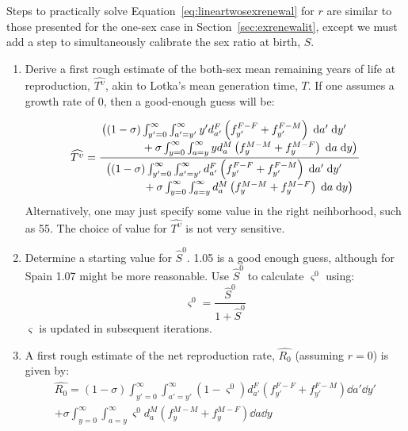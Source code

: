  \FloatBarrier
\label{sec:exrenewalit2}
Steps to practically solve Equation~\eqref{eq:lineartwosexrenewal} for $r$ are
similar to those presented for the one-sex case in
Section~\ref{sec:exrenewalit}, except we must add a step to simultaneously
calibrate the sex ratio at birth, $S$.
\begin{enumerate}
  \item Derive a first rough estimate of the both-sex mean remaining years of
  life at reproduction, $\widehat{T^\upsilon}$, akin to Lotka's mean generation time,
  $T$. If one assumes a growth rate of $0$, then a good-enough guess will be:

\begin{equation}
\label{eq:Tguess}
\widehat{T^\upsilon} = \frac{\splitfrac{
   \big((1 - \sigma)  \int _{y'=0}^\infty \int_{a'=y'}^\infty 
       y' d_{a'}^F \left( f_{y'}^{F-F} + f_{y'}^{F-M} \right) \dd a'\dd y'}{ + 
   \sigma \int_{y=0}^\infty \int _{a=y}^\infty y d_{a}^M  \left( f_{y}^{M-M}+
   f_{y}^{M-F} \right) \dd a \dd y \big)}}{\splitfrac{\big( (1 - \sigma) 
   \int_{y'=0}^\infty \int_{a'=y'}^\infty d_{a'}^F \left( f_{y'}^{F-F} +
   f_{y'}^{F-M} \right) \dd a'\dd y'}{ +\sigma \int _{y=0}^\infty
   \int_{a=y}^\infty d_{a}^M \left( f_{y}^{M-M} + f_{y}^{M-F} \right) \dd a \dd
   y \big)}}
\end{equation}
  Alternatively, one may just specify some value in the right neihborhood, such
  as 55. The choice of value for $\widehat{T^\upsilon}$ is not very sensitive.
 \item Determine a starting value for $\hat{S}^0$. 1.05 is a good enough guess,
although for Spain 1.07 might be more reasonable. Use $\hat{S}^0$ to calculate
$\varsigma^0$ using:
\begin{equation}
\label{eq:getvarsigmal}
\varsigma^0 = \frac{\hat{S}^0}{1+\hat{S}^0}
\end{equation}
$\varsigma$ is updated in subsequent iterations.
   \item A first rough estimate of the net reproduction rate, $\widehat{R_0}$ (assuming
  $r=0$) is given by: 
 \begin{equation}
 \begin{split}
 \widehat{R_0} = (1 - \sigma)  \int _{y'=0}^\infty \int_{a'=y'}^\infty 
                (1-\varsigma^0)d_{a'}^F \left(f_{y'}^{F-F} + f_{y'}^{F-M}\right)
                \dd a'\dd y' \\ + \sigma  \int _{y=0}^\infty \int _{a=y}^\infty 
               \varsigma^0 d_{a}^M  \left(f_{y}^{M-M}+ f_{y}^{M-F}\right) \dd a
               \dd y

\end{split}
\end{equation}
\end{enumerate}
